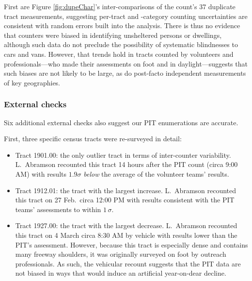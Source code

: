 \documentclass[11pt,twocolumn]{article}
\begin{document}
First are Figure \ref{fig:dupeChar}'s inter-comparisons of the count's 37 duplicate tract 
measurements, suggesting per-tract and -category counting uncertainties are consistent with  
random errors built into the analysis. There is thus no evidence that counters were biased in
identifying unsheltered persons or dwellings, although such data do not preclude the
possibility of systematic blindnesses to cars and vans. However, that trends hold in tracts counted 
by volunteers and professionals---who made their assessments on foot and in daylight---suggests 
that such biases are not likely to be large, as do post-facto independent measurements of 
key geographies.

\subsubsection{External checks}

Six additional external checks also suggest our PIT enumerations are accurate.

First, three specific census tracts were re-surveyed in detail:
\begin{itemize}
	\item Tract 1901.00: the only outlier tract in terms of inter-counter variability. L.~Abramson
		  recounted this tract 14 hours after the PIT count (circa 9:00 AM) with results 
		  $1.9\sigma$ {\it below} the average of the volunteer teams' results.
	\item Tract 1912.01: the tract with the largest increase. L.~Abramson recounted this tract on 
		27 Feb.\ circa 12:00 PM with results consistent with the PIT teams' assessments
		to within $1\,\sigma$.
	\item Tract 1927.00: the tract with the largest decrease. L.~Abramson recounted this tract
		on 4 March circa 8:30 AM by vehicle with results lower than the PIT's assessment. 
		However, because this tract is especially dense and contains many freeway shoulders,
		it was originally surveyed on foot by outreach professionals. As such, the vehicular recount
		suggests that the PIT data are not biased in ways that would induce an artificial 
		year-on-dear decline.				
\end{itemize}
\end{document}
